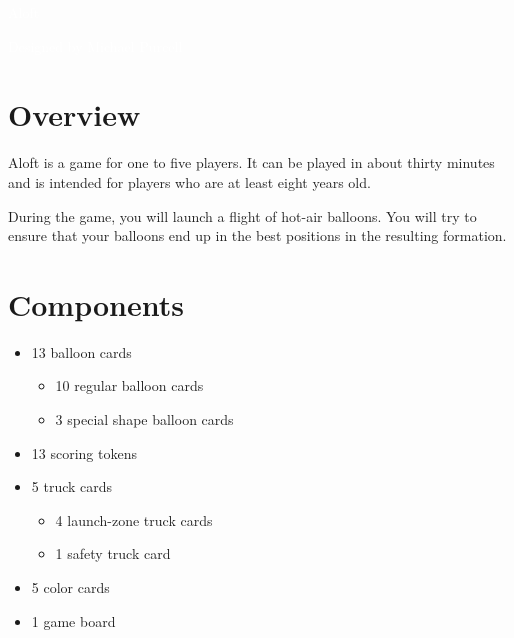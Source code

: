 \documentclass[a6paper, 11pt, parskip=half, DIV=15]{scrartcl}
\begin{document}
\begin{titlepage}

\enlargethispage{3.0\baselineskip}
\Huge
\vspace*{-1.0\baselineskip}
{
\setmainfont[Scale=2.2375]{Oi}
\begin{center}
\textcolor{white}{Aloft}
\end{center}
}
\vfill
\huge
\setmainfont[Scale=1.05]{Playball}
\begin{center}
\textcolor{white}{Designed by Michael Purcell}
\end{center}
\end{titlepage}


\ClearShipoutPicture
\enlargethispage{1.75\baselineskip}
\section*{Overview}
Aloft is a game for one to five players. It can be played in about thirty minutes and is intended for players who are at least eight years old.

During the game, you will launch a flight of hot-air balloons. You will try to ensure that your balloons end up in the best positions in the resulting formation.

\section*{Components}
\begin{itemize}[nosep]
  \item 13 balloon cards
    \begin{itemize}[nosep]
      \item 10 regular balloon cards
      \item 3 special shape balloon cards
    \end{itemize}
  \item 13 scoring tokens
  \item 5 truck cards
    \begin{itemize}[nosep]
      \item 4 launch-zone truck cards
      \item 1 safety truck card
    \end{itemize}
  \item 5 color cards
  \item 1 game board
\end{itemize}
\end{document}

